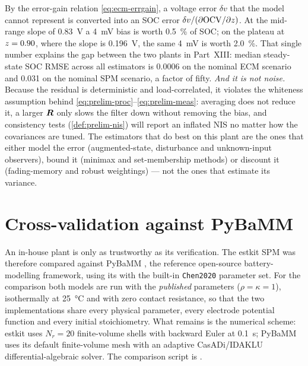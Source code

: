 \begin{remark}\label{rem:spm-4mv}
By the error-gain relation \eqref{eq:ecm-errgain}, a voltage error $\delta v$ that the model
cannot represent is converted into an SOC error $\delta v/(\partial\mathrm{OCV}/\partial z)$. At the
mid-range slope of \SI{0.83}{\volt} a \SI{4}{\milli\volt} bias is worth \SI{0.5}{\percent} of
SOC; on the plateau at $z = 0.90$, where the slope is \SI{0.196}{\volt}, the same
\SI{4}{\milli\volt} is worth \SI{2.0}{\percent}. That single number explains the gap between the
two plants in Part~XIII: median steady-state SOC RMSE across all estimators is \num{0.0006} on
the nominal ECM scenario and \num{0.031} on the nominal SPM scenario, a factor of fifty.
\emph{And it is not noise.} Because the residual is deterministic and load-correlated, it
violates the whiteness assumption behind \eqref{eq:prelim-proc}--\eqref{eq:prelim-meas}: averaging
does not reduce it, a larger $\bm{R}$ only slows the filter down without removing the bias, and
consistency tests (\cref{def:prelim-nis}) will report an inflated NIS no matter how the
covariances are tuned. The estimators that do best on this plant are the ones that either model
the error (augmented-state, disturbance and unknown-input observers), bound it (minimax and
set-membership methods) or discount it (fading-memory and robust weightings) --- not the ones
that estimate its variance.
\end{remark}

\section{Cross-validation against PyBaMM}
\label{sec:spm-pybamm}

An in-house plant is only as trustworthy as its verification. The estkit SPM was therefore
compared against PyBaMM \cite{sulzer2021pybamm}, the reference open-source battery-modelling
framework, using its  with the built-in \texttt{Chen2020} parameter set.
For the comparison both models are run with the \emph{published} parameters
($\rho=\kappa=1$), isothermally at \SI{25}{\celsius} and with zero contact resistance, so that
the two implementations share every physical parameter, every electrode potential function and
every initial stoichiometry. What remains is the numerical scheme: estkit uses $N_r = 20$
finite-volume shells with backward Euler at \SI{0.1}{\second}; PyBaMM uses its default
finite-volume mesh with an adaptive CasADi/IDAKLU differential-algebraic solver. The comparison
script is .


